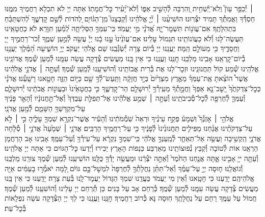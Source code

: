 \documentclass[twoside, openany, parskip=half, 11pt]{book}
\begin{document}
׀ יְ֯כַפֵּ֥ר עָוֺן֮ וְֽלֹא־יַֽ֫שְׁחִ֥ית וְ֭הִרְבָּה לְ֯הָשִׁ֣יב אַפּ֑וֹ וְ֯לֹא־יָ֝עִ֗יר כׇּל־חֲמָתֽוֹ׃ אַתָּה יְיָ לֹא תִכְלָא רַחֲמֶיךָ מִמֶּֽנּוּ חַסְדְּ֯ךָ וַאֲמִתְּ֯ךָ תָּמִיד יִצְּ֯רֽוּנוּ׃ הוֹשִׁיעֵ֨נוּ ׀ יְ֘יָ֤ אֱלֹהֵ֗ינוּ וְ֯קַבְּצֵנוּ֮ מִֽן־הַגּ֫וֹיִ֥ם לְ֭הֹדוֹת לְ֯שֵׁ֣ם קׇדְשֶׁ֑ךָ לְ֝הִשְׁתַּבֵּ֗חַ בִּתְהִלָּתֶֽךָ׃
אִם־עֲוֺנ֥וֹת תִּשְׁמׇר־יׇ֑הּ אֲ֝דֹנָ֗י מִ֣י יַעֲמֹֽד׃ כִּֽי־עִמְּךָ֥ הַסְּלִיחָ֑ה לְ֝מַ֗עַן תִּוָּרֵֽא׃ לֹא כַחֲטָאֵֽינוּ תַּעֲשֶׂה־לָּנוּ וְ֯לֹא כַעֲוֹנוֹתֵֽינוּ תִּגְמוֹל עָלֵינוּ׃
אִם־עֲוֺנֵ֙ינוּ֙ עָ֣נוּ בָ֔נוּ יְיָ֕ עֲשֵׂ֖ה לְ֯מַ֣עַן שְׁמֶ֑ךָ זְ֯כֹר־רַחֲמֶ֣יךָ ייָ֭ וַחֲסָדֶ֑יךָ כִּ֖י מֵעוֹלָ֣ם הֵֽמָּה׃ יַעֲנֵֽנוּ יְיָ בְּ֯יוֹם צָרָה יְ֯שַׂגְּ֯בֵֽנוּ שֵׁם אֱלֹהֵי יַעֲקֹב׃
יְיָ֥  הוֹשִׁ֑יעָה הַ֝מֶּ֗לֶךְ יַעֲנֵ֥נוּ בְ֯יוֹם־קׇרְאֵֽנוּ׃
אָבִֽינוּ מַלְכֵּֽנוּ חׇנֵּֽנוּ וַעֲנֵֽנוּ כִּי אֵין בָּֽנוּ מַעֲשִׂים צְ֯דָקָה עֲשֵׂה עִמָּֽנוּ לְ֯מַעַן שְׁ֯מֶךָ׃
אֲדוֹנֵֽינוּ אֱלֹהֵֽינוּ שְׁ֯מַע קוֹל תַּחֲנוּנֵֽינוּ וּזְכׇר־לָנוּ אֶת בְּ֯רִית אֲבוֹתֵֽינוּ וְ֯הוֹשִׁיעֵֽנוּ לְ֯מַֽעַן שְׁ֯מֶךָ׃
וְ֯עַתָּ֣ה ׀ אֲדֹנָ֣י אֱלֹהֵ֗ינוּ אֲשֶׁר֩ הוֹצֵ֨אתָ אֶֽת־עַמְּךָ֜ מֵאֶ֤רֶץ מִצְרַ֙יִם֙ בְּיָ֣ד חֲזָקָ֔ה וַתַּֽעַשׂ־לְ֯ךָ֥ שֵׁ֖ם כַּיּ֣וֹם הַזֶּ֑ה חָטָ֖אנוּ רָשָֽׁעְ֯נוּ׃ אֲדֹנָ֗י כְּכׇל־צִדְקֹתֶ֙ךָ֙ יָֽשׇׁב־נָ֤א אַפְּךָ֙ וַחֲמָ֣תְ֯ךָ֔ מֵעִֽירְ֯ךָ֥ יְ֯רוּשָׁלַ֖‍ִם הַר־קׇדְשֶׁ֑ךָ כִּ֤י בַחֲטָאֵ֙ינוּ֙ וּבַעֲוֺנ֣וֹת אֲבֹתֵ֔ינוּ יְ֯רוּשָׁלַ֧‍ִם וְ֯עַמְּךָ֛ לְ֯חֶרְפָּ֖ה לְ֯כׇל־סְ֯בִיבֹתֵֽינוּ׃ וְ֯עַתָּ֣ה ׀ שְׁמַ֣ע אֱלֹהֵ֗ינוּ אֶל־תְּפִלַּ֤ת עַבְדְּךָ֙ וְ֯אֶל־תַּ֣חֲנוּנָ֔יו וְ֯הָאֵ֣ר פָּנֶ֔יךָ עַל־מִקְדָּשְׁךָ֖ הַשָּׁמֵ֑ם לְ֯מַ֖עַן אֲדֹנָֽי׃\\
אֱלֹהַ֥י ׀ אׇזְנְ֯ךָ֮ וּֽשְׁמָע֒ פְּקַ֣ח עֵינֶ֗יךָ וּרְאֵה֙ שֹֽׁמְ֯מֹתֵ֔ינוּ וְ֯הָעִ֕יר אֲשֶׁר־נִקְרָ֥א שִׁמְךָ֖ עָלֶ֑יהָ כִּ֣י ׀ לֹ֣א עַל־צִדְקֹתֵ֗ינוּ אֲנַ֨חְנוּ מַפִּילִ֤ים תַּחֲנוּנֵ֙ינוּ֙ לְ֯פָנֶ֔יךָ כִּ֖י עַל־רַחֲמֶ֥יךָ הָרַבִּֽים׃ אֲדֹנָ֤י ׀ שְׁמָ֙עָה֙ אֲדֹנָ֣י ׀ סְ֯לָ֔חָה אֲדֹנָ֛י הַֽקְשִׁ֥יבָה וַעֲשֵׂ֖ה אַל־תְּאַחַ֑ר לְ֯מַֽעַנְךָ֣ אֱלֹהַ֔י כִּֽי־שִׁמְךָ֣ נִקְרָ֔א עַל־עִירְ֯ךָ֖ וְ֯עַל־עַמֶּֽךָ׃ אָבִֽינוּ אָב הָרַחֲמָן הַרְאֵֽנוּ אוֹת לְ֯טוֹבָה וְ֯קַבֵּץ נְ֯פוּצוֹתֵֽינוּ מֵאַרְבַּע כַּנְפוֹת הָאָרֶץ יַכִּירוּ וְ֯יֵדְעוּ כׇּל־הַגּוֹיִם כִּי אַתָּה יְיָ אֱלֹהֵֽינוּ׃
וְ֯עַתָּ֥ה ייָ֖ אָבִ֣ינוּ אָ֑תָּה אֲנַ֤חְנוּ הַחֹ֙מֶר֙ וְ֯אַתָּ֣ה יֹצְ֯רֵ֔נוּ וּמַעֲשֵׂ֥ה יָדְ֯ךָ֖ כֻּלָּֽנוּ׃ הוֹשִׁיעֵֽנוּ לְ֯מַעַן שְׁ֯מֶךָ צוּרֵֽנוּ מַלְכֵּֽנוּ וְ֯גוֹאֲלֵֽנוּ׃
ח֧וּסָה יְיָ֣ עַל־עַמֶּ֗ךָ וְ֯אַל־תִּתֵּ֨ן נַחֲלָתְ֯ךָ֤ לְ֯חֶרְפָּה֙ לִמְשׇׁל־בָּ֣ם גּוֹיִ֔ם לָ֚מָּה יֹאמְ֯ר֣וּ בָעַמִּ֔ים אַיֵּ֖ה אֱלֹהֵיהֶֽם׃ יָדַֽעְנוּ כִּי חָטָֽאנוּ וְ֯אֵין מִי יַעֲמֹד בַּעֲדֵֽנוּ שִׁמְךָ הַגָּדוֹל יַעֲמׇד־לָֽנוּ בְּ֯עֵת צָרָה׃ יָדַֽעְנוּ כִּי אֵין בָּֽנוּ מַעֲשִׂים צְ֯דָקָה עֲשֵׂה עִמָּֽנוּ לְ֯מַעַן שְׁ֯מֶֽךָ׃ כְּ֯רַחֵם אָב עַל בָּנִים כֵּן תְּ֯רַחֵם יְיָ עָלֵינוּ וְ֯הוֹשִׁעֵֽנוּ לְ֯מַעַן שְׁ֯מֶךָ׃ חֲמוֹל עַל עַמֶּֽךָ רַחֵם עַל נַחֲלָתֶֽךָ חֽוּסָה נָּא כְּ֯רוֹב רַחֲמֶיךָ׃ חׇנֵּֽנוּ וַעֲנֵֽנוּ כִּי לְךָ יְיָ הַצְּ֯דָקָה עֹשֵׂה נִפְלָאוֹת בְּ֯כׇל־עֵת׃\\
\end{document}
